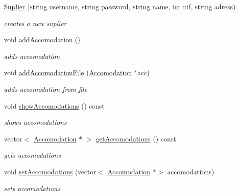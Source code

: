 \begin{DoxyCompactItemize}
\item 
\hyperlink{class_suplier_a01702f1e6b57b187c8e0ecb06a9b2a4d}{Suplier} (string username, string password, string name, int nif, string adress)
\begin{DoxyCompactList}\small\item\em creates a new suplier \end{DoxyCompactList}\item 
\hypertarget{class_suplier_ac95a8bff3f58f427e69d88d8998853f3}{}\label{class_suplier_ac95a8bff3f58f427e69d88d8998853f3} 
void \hyperlink{class_suplier_ac95a8bff3f58f427e69d88d8998853f3}{add\+Accomodation} ()
\begin{DoxyCompactList}\small\item\em adds accomodation \end{DoxyCompactList}\item 
void \hyperlink{class_suplier_a817ef61f9a01bd480073448f1e382061}{add\+Accomodation\+File} (\hyperlink{class_accomodation}{Accomodation} $\ast$acc)
\begin{DoxyCompactList}\small\item\em adds accomodation from file \end{DoxyCompactList}\item 
\hypertarget{class_suplier_a0912f635fff680c5a321b45968c9cded}{}\label{class_suplier_a0912f635fff680c5a321b45968c9cded} 
void \hyperlink{class_suplier_a0912f635fff680c5a321b45968c9cded}{show\+Accomodations} () const
\begin{DoxyCompactList}\small\item\em shows accomodations \end{DoxyCompactList}\item 
vector$<$ \hyperlink{class_accomodation}{Accomodation} $\ast$ $>$ \hyperlink{class_suplier_a87e65aee86b034f1b4a112abb83ff53a}{get\+Accomodations} () const
\begin{DoxyCompactList}\small\item\em gets accomodations \end{DoxyCompactList}\item 
void \hyperlink{class_suplier_a9b99e7cbd4cb78a97cad39ffd6d0a691}{set\+Accomodations} (vector$<$ \hyperlink{class_accomodation}{Accomodation} $\ast$$>$ accomodations)
\begin{DoxyCompactList}\small\item\em sets accomodations \end{DoxyCompactList}\item 
$$
\end{DoxyCompactItemize}
